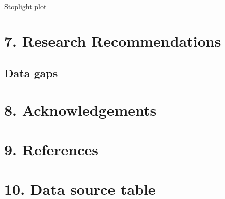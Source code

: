 \documentclass[
  letterpaper,
  oneside,
  open=any]{scrbook}
\begin{document}
Stoplight plot


\hypertarget{research-recommendations}{%
\chapter{7. Research Recommendations}\label{research-recommendations}}

\hypertarget{data-gaps}{%
\section{Data gaps}\label{data-gaps}}


\hypertarget{acknowledgements}{%
\chapter{8. Acknowledgements}\label{acknowledgements}}


\hypertarget{references}{%
\chapter{9. References}\label{references}}


\hypertarget{data-source-table}{%
\chapter{10. Data source table}\label{data-source-table}}


\backmatter
\end{document}
